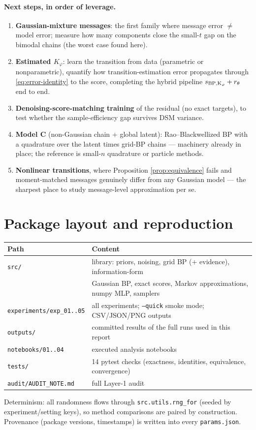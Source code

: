 \documentclass[11pt]{article}
\begin{document}
\paragraph{Next steps, in order of leverage.}
\begin{enumerate}[leftmargin=1.6em]
  \item \textbf{Gaussian-mixture messages}: the first family where message error
  $\neq$ model error; measure how many components close the small-$t$ gap on the
  bimodal chains (the worst case found here).
  \item \textbf{Estimated $K_\varphi$}: learn the transition from data (parametric or
  nonparametric), quantify how transition-estimation error propagates through
  \eqref{eq:error-identity} to the score, completing the hybrid pipeline
  $s_{\rm BP,K_\varphi}+r_\theta$ end to end.
  \item \textbf{Denoising-score-matching training} of the residual (no exact targets),
  to test whether the sample-efficiency gap survives DSM variance.
  \item \textbf{Model C} (non-Gaussian chain $+$ global latent): Rao--Blackwellized
  BP with a quadrature over the latent times grid-BP chains --- machinery already in
  place; the reference is small-$n$ quadrature or particle methods.
  \item \textbf{Nonlinear transitions}, where Proposition \ref{prop:equivalence}
  fails and moment-matched messages genuinely differ from any Gaussian model ---
  the sharpest place to study message-level approximation per se.
\end{enumerate}

\appendix
\section{Package layout and reproduction}
\begin{center}
\begin{tabular}{ll}
\toprule
Path & Content\\
\midrule
\texttt{src/} & library: priors, noising, grid BP ($+$ evidence), information-form\\
 & Gaussian BP, exact scores, Markov approximations, numpy MLP, samplers\\
\texttt{experiments/exp\_01..05} & all experiments; \texttt{--quick} smoke mode; CSV/JSON/PNG outputs\\
\texttt{outputs/} & committed results of the full runs used in this report\\
\texttt{notebooks/01..04} & executed analysis notebooks\\
\texttt{tests/} & 14 pytest checks (exactness, identities, equivalence, convergence)\\
\texttt{audit/AUDIT\_NOTE.md} & full Layer-1 audit\\
\bottomrule
\end{tabular}
\end{center}
Determinism: all randomness flows through \texttt{src.utils.rng\_for} (seeded by
experiment/setting keys), so method comparisons are paired by construction. Provenance
(package versions, timestamps) is written into every \texttt{params.json}.
\end{document}

